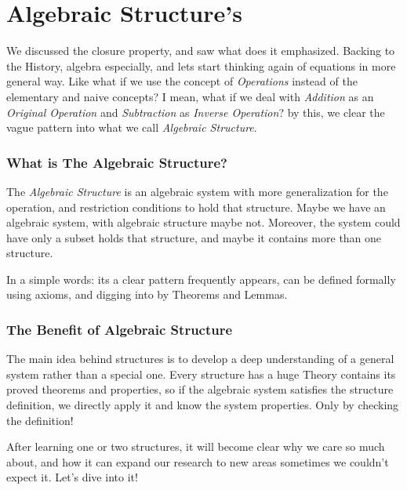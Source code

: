 \section{Algebraic Structure's}
We discussed the closure property, and saw what does it emphasized. Backing to the History, algebra especially, and lets start thinking again of equations in more general way. Like what if we use the concept of {\it Operations} instead of the elementary and naive concepts? I mean, what if we deal with {\it Addition} as an {\it Original Operation} and {\it Subtraction} as {\it Inverse Operation}? by this, we clear the vague pattern into what we call {\it Algebraic Structure}.

\subsubsection{What is The Algebraic Structure?}
The {\it Algebraic Structure} is an algebraic system with more generalization for the operation, and restriction conditions to hold that structure. Maybe we have an algebraic system, with algebraic structure maybe not. Moreover, the system could have only a subset holds that structure, and maybe it contains more than one structure.

In a simple words: its a clear pattern frequently appears, can be defined formally using axioms, and digging into by Theorems and Lemmas.

\subsubsection{The Benefit of Algebraic Structure}
The main idea behind structures is to develop a deep understanding of a general system rather than a special one. Every structure has a huge Theory contains its proved theorems and properties, so if the algebraic system satisfies the structure definition, we directly apply it and know the system properties. Only by checking the definition!

After learning one or two structures, it will become clear why we care so much about, and how it can expand our research to new areas sometimes we couldn't expect it. Let's dive into it!